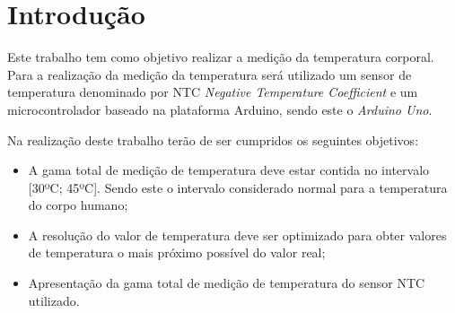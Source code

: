 
\section{Introdução}
Este trabalho tem como objetivo realizar a medição da temperatura corporal. Para a realização da medição da temperatura será utilizado um sensor de temperatura denominado por NTC \textit{Negative Temperature Coefficient} e um microcontrolador baseado na plataforma Arduino, sendo este o \textit{Arduino Uno}.

Na realização deste trabalho terão de ser cumpridos os seguintes objetivos:
\begin{itemize}
	\item A gama total de medição de temperatura deve estar contida no intervalo [30ºC; 45ºC]. Sendo este o intervalo considerado normal para a temperatura do corpo humano;
	\item A resolução do valor de temperatura deve ser optimizado para obter valores de temperatura o mais próximo possível do valor real;
	\item Apresentação da gama total de medição de temperatura do sensor NTC utilizado.
\end{itemize}

\newpage
